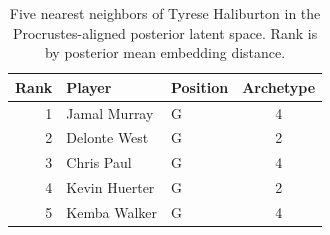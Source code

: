 \begin{table}[htbp]
  \centering\small
  \begin{tabular}{rllc}
    \toprule
    Rank & Player & Position & Archetype \\
    \midrule
    1 & Jamal Murray & G & 4 \\
    2 & Delonte West & G & 2 \\
    3 & Chris Paul & G & 4 \\
    4 & Kevin Huerter & G & 2 \\
    5 & Kemba Walker & G & 4 \\
    \bottomrule
  \end{tabular}
  \caption{Five nearest neighbors of Tyrese Haliburton in the Procrustes-aligned posterior latent space. Rank is by posterior mean embedding distance.}
  \label{tab:Tyrese_Haliburton_neighbors}
\end{table}

